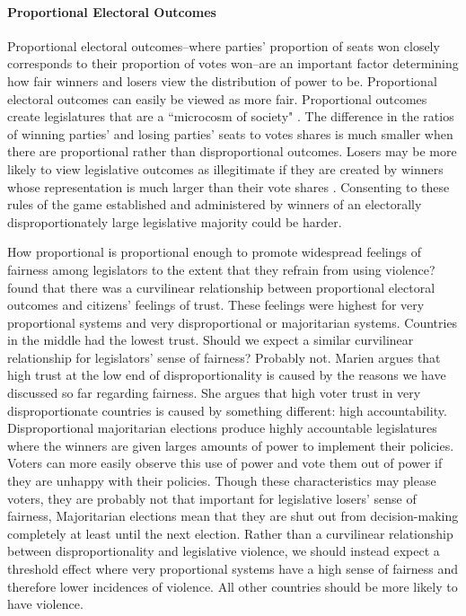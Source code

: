 \documentclass[a4paper]{article}\usepackage{graphicx, color}
\begin{document}
\paragraph{Proportional Electoral Outcomes}

Proportional electoral outcomes--where parties' proportion of seats won closely corresponds to their proportion of votes won--are an important factor determining how fair winners and losers view the distribution of power to be. Proportional electoral outcomes can easily be viewed as more fair. Proportional outcomes create legislatures that are a ``microcosm of society" \citep{Carey2011}. The difference in the ratios of winning parties' and losing parties' seats to votes shares is much smaller when there are proportional rather than disproportional outcomes. Losers may be more likely to view legislative outcomes as illegitimate if they are created by winners whose representation is much larger than their vote shares \citep[see][]{lijphart1999}. Consenting to these rules of the game established and administered by winners of an electorally disproportionately large legislative majority could be harder.

How proportional is proportional enough to promote widespread feelings of fairness among legislators to the extent that they refrain from using violence? \cite{Marien2011} found that there was a curvilinear relationship between proportional electoral outcomes and citizens' feelings of trust. These feelings were highest for very proportional systems and very disproportional or majoritarian systems. Countries in the middle had the lowest trust. Should we expect a similar curvilinear relationship for legislators' sense of fairness? Probably not. Marien argues that high trust at the low end of disproportionality is caused by the reasons we have discussed so far regarding fairness. She argues that high voter trust in very disproportionate countries is caused by something different: high accountability. Disproportional majoritarian elections produce highly accountable legislatures \citep{Aarts2008} where the winners are given larges amounts of power to implement their policies. Voters can more easily observe this use of power and vote them out of power if they are unhappy with their policies. Though these characteristics may please voters, they are probably not that important for legislative losers' sense of fairness, Majoritarian elections mean that they are shut out from decision-making completely at least until the next election. Rather than a curvilinear relationship between disproportionality and legislative violence, we should instead expect a threshold effect where very proportional systems have a high sense of fairness and therefore lower incidences of violence. All other countries should be more likely to have violence. 
\end{document}
